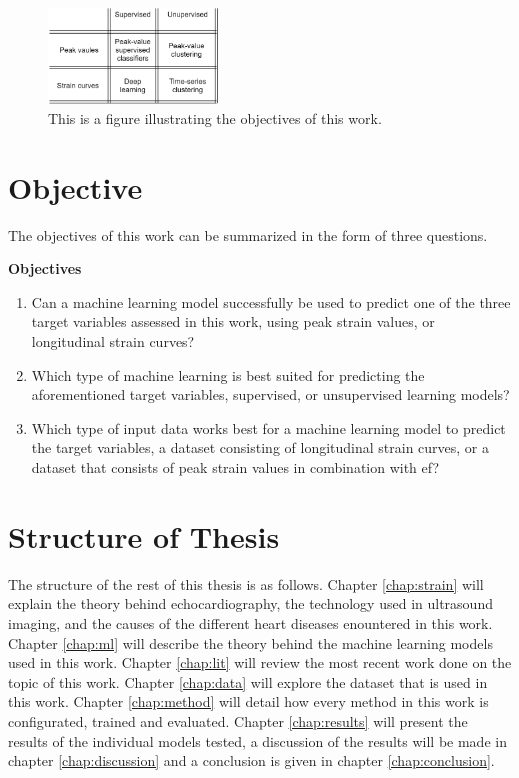 \begin{figure}[H]
    \centering
    \includegraphics[width=0.4\textwidth]{intro/objectives_diagram.png}
    \caption{This is a figure illustrating the objectives of this work.}
    \label{fig:objectives_diagram}
\end{figure}

\section{Objective} \label{sec:objective}

The objectives of this work can be summarized in the form of three questions.

\begin{tcolorbox}
    \textbf{Objectives}

    \begin{enumerate}
        \item Can a machine learning model successfully be used to predict one of the three target variables assessed in this work, using peak strain values, or longitudinal strain curves?
        \item Which type of machine learning is best suited for predicting the aforementioned target variables, supervised, or unsupervised learning models?
        \item Which type of input data works best for a machine learning model to predict the target variables, a dataset consisting of longitudinal strain curves, or a dataset that consists of peak strain values in combination with \acrshort{ef}?
    \end{enumerate}
\end{tcolorbox}

\section{Structure of Thesis}

The structure of the rest of this thesis is as follows. Chapter \ref{chap:strain} will explain the theory behind echocardiography, the technology used in ultrasound imaging, and the causes of the different heart diseases enountered in this work. Chapter \ref{chap:ml} will describe the theory behind the machine learning models used in this work. Chapter \ref{chap:lit} will review the most recent work done on the topic of this work. Chapter \ref{chap:data} will explore the dataset that is used in this work. Chapter \ref{chap:method} will detail how every method in this work is configurated, trained and evaluated. Chapter \ref{chap:results} will present the results of the individual models tested, a discussion of the results will be made in chapter 
\ref{chap:discussion} and a conclusion is given in chapter \ref{chap:conclusion}.